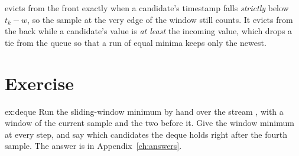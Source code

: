 \sentil{} evicts from the front exactly when a candidate's timestamp falls \emph{strictly} below $t_k - w$, so the sample at the very edge of the window still counts. It evicts from the back while a candidate's value is \emph{at least} the incoming value, which drops a tie from the queue so that a run of equal minima keeps only the newest.

\section{Exercise}

\begin{exercise}{ex:deque}
Run the sliding-window minimum by hand over the stream , with a window of the current sample and the two before it. Give the window minimum at every step, and say which candidates the deque holds right after the fourth sample. The answer is in Appendix~\ref{ch:answers}.
\end{exercise}